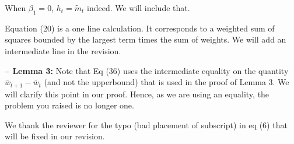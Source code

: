 \documentclass[wcp]{jmlr}
\begin{document}
When $\beta_1 = 0$, $h_t = \tilde{m}_t$ indeed. We will include that.

Equation (20) is a one line calculation. It corresponds to a weighted sum of squares bounded by the largest term times the sum of weights.
We will add an intermediate line in the revision.

\medskip
\textbf{-- Lemma 3:}
Note that Eq (36) uses the intermediate equality on the quantity $\overline{w}_{t+1} - \overline{w}_t$ (and not the upperbound) that is used in the proof of Lemma 3. We will clarify this point in our proof.
Hence, as we are using an equality, the problem you raised is no longer one.


We thank the reviewer for the typo (bad placement of subscript) in eq (6) that will be fixed in our revision.
\end{document}
